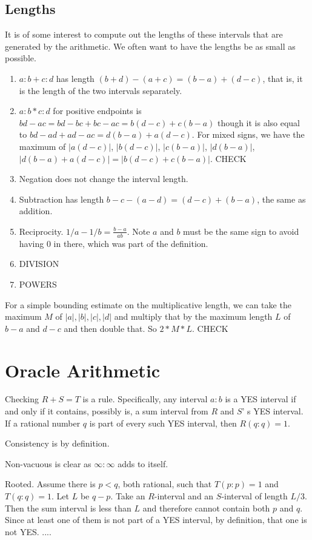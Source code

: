 \documentclass[12pt]{article}
\theoremstyle{remark}
\begin{document}
\subsection{Lengths}

It is of some interest to compute out the lengths of these intervals that are generated by the arithmetic. We often want to have the lengths be as small as possible. 

\begin{enumerate}
    \item $a:b + c:d$ has length $(b+d) - (a+c) = (b-a) + (d-c)$, that is, it is the length of the two intervals separately. 
    \item $a:b*c:d$ for positive endpoints is $bd-ac = bd -bc + bc -ac =  b(d-c) + c(b-a)$ though it is also equal to $bd - ad + ad - ac = d(b-a) + a(d-c)$. For mixed signs, we have the maximum of $|a(d-c)|$, $|b(d-c)|$, $|c(b-a)|$, $|d(b-a)|$, $|d(b-a)+a(d-c)| = |b(d-c) + c(b-a)|$.  CHECK
    \item Negation does not change the interval length. 
    \item Subtraction has length $b-c - (a-d) = (d-c) + (b-a)$, the same as addition.
    \item Reciprocity. $1/a - 1/b = \tfrac{b-a}{ab}$. Note $a$ and $b$ must be the same sign to avoid having 0 in there, which was part of the definition. 
    \item DIVISION
    \item POWERS
\end{enumerate}

For a simple bounding estimate on the multiplicative length, we can take the maximum $M$ of $|a|, |b|, |c|, |d|$ and multiply that by the maximum length $L$ of $b-a$ and $d-c$ and then double that. So $2*M*L$.  CHECK 


\section{Oracle Arithmetic}


Checking $R+S=T$ is a rule. Specifically, any interval $a:b$ is a YES interval if and only if it contains, possibly is, a sum interval from $R$ and $S$' s YES interval. If a rational number $q$ is part of every such YES interval, then $R(q:q) = 1$. 

Consistency is by definition. 

Non-vacuous is clear as $\infty:\infty$ adds to itself. 

Rooted. Assume there is $p<q$, both rational, such that $T(p:p)=1$ and $T(q:q) =1$. Let $L$ be $q-p$. Take an $R$-interval and an $S$-interval of length $L/3$. Then the sum interval is less than $L$ and therefore cannot contain both $p$ and $q$. Since at least one of them is not part of a YES interval, by definition, that one is not YES.  .... 
\end{document}
